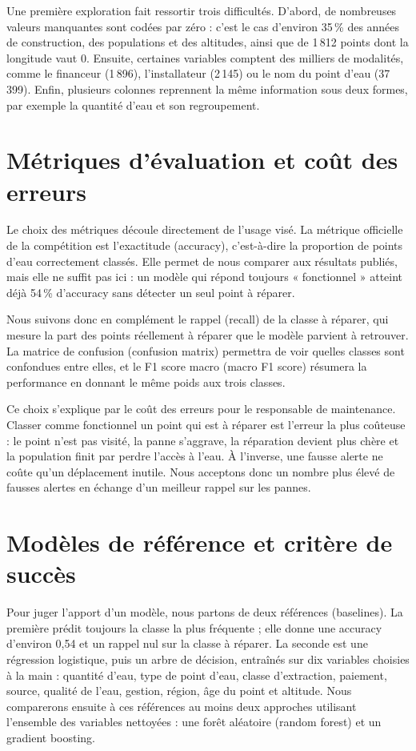 \documentclass[10pt,a4paper]{article}
\begin{document}
Une première exploration fait ressortir trois difficultés. D'abord, de nombreuses valeurs manquantes sont codées par zéro : c'est le cas d'environ 35\,\% des années de construction, des populations et des altitudes, ainsi que de 1\,812 points dont la longitude vaut 0. Ensuite, certaines variables comptent des milliers de modalités, comme le financeur (1\,896), l'installateur (2\,145) ou le nom du point d'eau (37\,399). Enfin, plusieurs colonnes reprennent la même information sous deux formes, par exemple la quantité d'eau et son regroupement.

\section{Métriques d'évaluation et coût des erreurs}
Le choix des métriques découle directement de l'usage visé. La métrique officielle de la compétition est l'exactitude (accuracy), c'est-à-dire la proportion de points d'eau correctement classés. Elle permet de nous comparer aux résultats publiés, mais elle ne suffit pas ici : un modèle qui répond toujours « fonctionnel » atteint déjà 54\,\% d'accuracy sans détecter un seul point à réparer.

Nous suivons donc en complément le rappel (recall) de la classe à réparer, qui mesure la part des points réellement à réparer que le modèle parvient à retrouver. La matrice de confusion (confusion matrix) permettra de voir quelles classes sont confondues entre elles, et le F1 score macro (macro F1 score) résumera la performance en donnant le même poids aux trois classes.

Ce choix s'explique par le coût des erreurs pour le responsable de maintenance. Classer comme fonctionnel un point qui est à réparer est l'erreur la plus coûteuse : le point n'est pas visité, la panne s'aggrave, la réparation devient plus chère et la population finit par perdre l'accès à l'eau. À l'inverse, une fausse alerte ne coûte qu'un déplacement inutile. Nous acceptons donc un nombre plus élevé de fausses alertes en échange d'un meilleur rappel sur les pannes.

\section{Modèles de référence et critère de succès}
Pour juger l'apport d'un modèle, nous partons de deux références (baselines). La première prédit toujours la classe la plus fréquente ; elle donne une accuracy d'environ 0,54 et un rappel nul sur la classe à réparer. La seconde est une régression logistique, puis un arbre de décision, entraînés sur dix variables choisies à la main : quantité d'eau, type de point d'eau, classe d'extraction, paiement, source, qualité de l'eau, gestion, région, âge du point et altitude. Nous comparerons ensuite à ces références au moins deux approches utilisant l'ensemble des variables nettoyées : une forêt aléatoire (random forest) et un gradient boosting.
\end{document}
